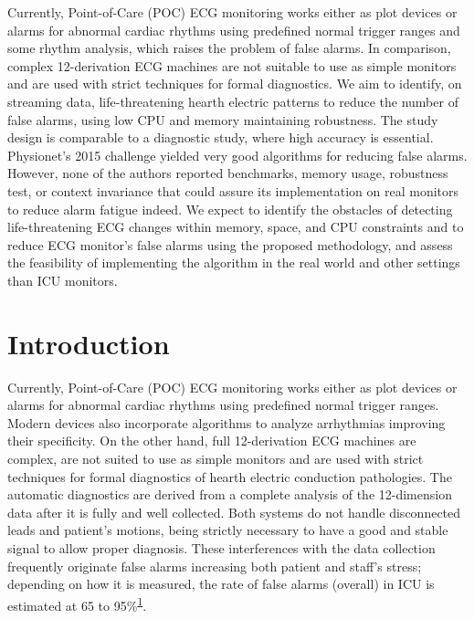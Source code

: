 \documentclass[12pt,twoside]{reedthesis}
\begin{document}
Currently, Point-of-Care (POC) ECG monitoring works either as plot devices or alarms for abnormal cardiac rhythms using
predefined normal trigger ranges and some rhythm analysis, which raises the problem of false alarms. In comparison,
complex 12-derivation ECG machines are not suitable to use as simple monitors and are used with strict techniques for
formal diagnostics. We aim to identify, on streaming data, life-threatening hearth electric patterns to reduce the
number of false alarms, using low CPU and memory maintaining robustness. The study design is comparable to a diagnostic
study, where high accuracy is essential. Physionet's 2015 challenge yielded very good algorithms for reducing false
alarms. However, none of the authors reported benchmarks, memory usage, robustness test, or context invariance that
could assure its implementation on real monitors to reduce alarm fatigue indeed. We expect to identify the obstacles of
detecting life-threatening ECG changes within memory, space, and CPU constraints and to reduce ECG monitor's false
alarms using the proposed methodology, and assess the feasibility of implementing the algorithm in the real world and
other settings than ICU monitors.

\hypertarget{introduction}{%
\chapter*{Introduction}\label{introduction}}

Currently, Point-of-Care (POC) ECG monitoring works either as plot devices or alarms for abnormal cardiac rhythms using
predefined normal trigger ranges. Modern devices also incorporate algorithms to analyze arrhythmias improving their
specificity. On the other hand, full 12-derivation ECG machines are complex, are not suited to use as simple monitors
and are used with strict techniques for formal diagnostics of hearth electric conduction pathologies. The automatic
diagnostics are derived from a complete analysis of the 12-dimension data after it is fully and well collected. Both
systems do not handle disconnected leads and patient's motions, being strictly necessary to have a good and stable
signal to allow proper diagnosis. These interferences with the data collection frequently originate false alarms
increasing both patient and staff's stress; depending on how it is measured, the rate of false alarms (overall) in ICU
is estimated at 65 to 95\%\textsuperscript{\protect\hyperlink{ref-donchin2002}{1}}.
\end{document}
